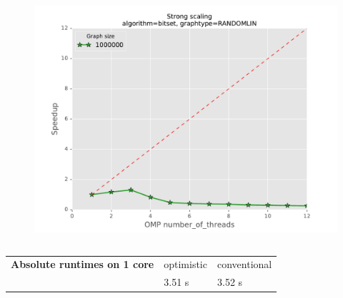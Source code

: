 \begin{frame}
\begin{columns}[T]
\begin{figure}[!ht]
\begin{center}
      \includegraphics[width=\textwidth]{img/strongscaling_bitset_gtRANDOMLIN30_opt0.pdf}
    \end{center}
  \end{figure}  
\end{columns}

\begin{table}
\tiny
\begin{tabular}{lp{1cm}|p{1cm}}
 {\bfseries Absolute runtimes on 1 core}  & optimistic  & conventional \\
                                          & 3.51 s      & 3.52 s
\end{tabular}
\end{table}

\end{frame}

